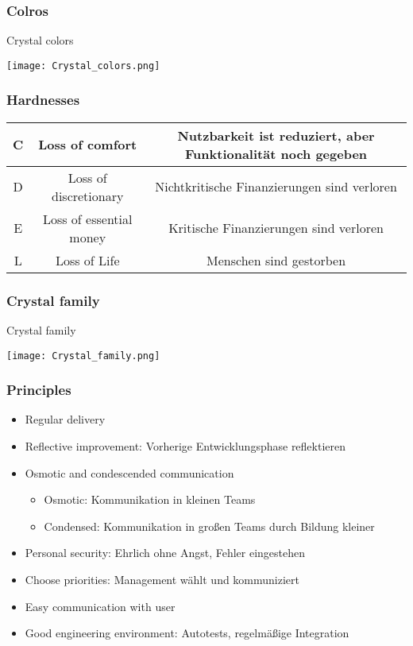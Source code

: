 \subsubsection{Colros}
\begin{table}[H]
\caption{Crystal colors}	
\texttt{[image: Crystal\_colors.png]}
\end{table}
\subsubsection{Hardnesses}
\begin{tabular}{|c|c|c|}
	\hline
	C & Loss of comfort & Nutzbarkeit ist reduziert, aber Funktionalität noch gegeben \\
	\hline
	D & Loss of discretionary & Nichtkritische Finanzierungen sind verloren \\
	\hline
	E & Loss of essential money & Kritische Finanzierungen sind verloren \\
	\hline
	L & Loss of Life & Menschen sind gestorben \\
	\hline
\end{tabular}
\subsubsection{Crystal family}
\begin{table}[H]
\caption{Crystal family}
\texttt{[image: Crystal\_family.png]}
\end{table}
\subsubsection{Principles}
\begin{itemize}
	\item Regular delivery
	\item Reflective improvement: Vorherige Entwicklungsphase reflektieren
	\item Osmotic and condescended communication
		\begin{itemize}
			\item Osmotic: Kommunikation in kleinen Teams
			\item Condensed: Kommunikation in großen Teams durch Bildung kleiner
		\end{itemize} 
	\item Personal security: Ehrlich ohne Angst, Fehler eingestehen
	\item Choose priorities: Management wählt und kommuniziert
	\item Easy communication with user
	\item Good engineering environment: Autotests, regelmäßige Integration
\end{itemize}
